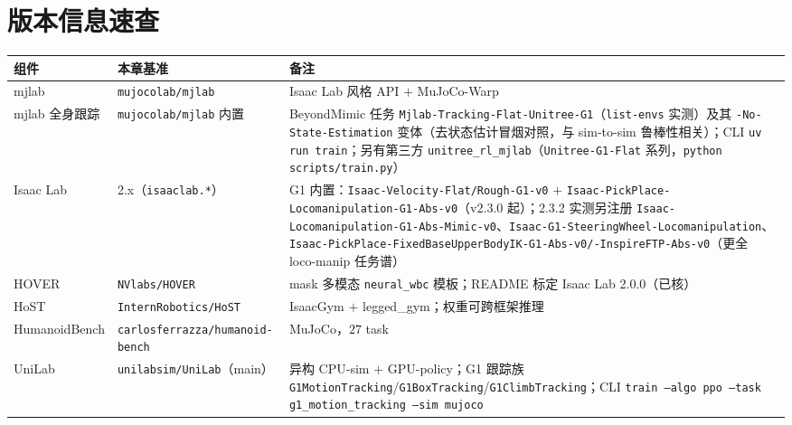 \section*{版本信息速查}

\begin{center}
\small
\begin{tabular}{p{3.4cm}p{4.2cm}p{5.0cm}}
\hline
组件 & 本章基准 & 备注 \\
\hline
mjlab & \texttt{mujocolab/\allowbreak mjlab} & Isaac Lab 风格 API $+$ MuJoCo-Warp\cite{mjlab2026} \\
mjlab 全身跟踪 & \texttt{mujocolab/\allowbreak mjlab} 内置 & BeyondMimic 任务 \texttt{Mjlab-Tracking-Flat-Unitree-G1}（\texttt{list-envs} 实测）及其 \texttt{-No-State-Estimation} 变体（去状态估计冒烟对照，与 sim-to-sim 鲁棒性相关）；CLI \texttt{uv run train}；另有第三方 \texttt{unitree\_rl\_mjlab}（\texttt{Unitree-G1-Flat} 系列，\texttt{python scripts/\allowbreak train.\allowbreak py}） \\
Isaac Lab & 2.x（\texttt{isaaclab.*}） & G1 内置：\texttt{Isaac-Velocity-Flat/\allowbreak Rough-G1-v0} $+$ \texttt{Isaac-PickPlace-Locomanipulation-G1-Abs-v0}（v2.3.0 起）；2.3.2 实测另注册 \texttt{Isaac-Locomanipulation-G1-Abs-Mimic-v0}、\texttt{Isaac-G1-SteeringWheel-Locomanipulation}、\texttt{Isaac-PickPlace-FixedBaseUpperBodyIK-G1-Abs-v0/\allowbreak -InspireFTP-Abs-v0}（更全 loco-manip 任务谱） \\
HOVER & \texttt{NVlabs/\allowbreak HOVER} & mask 多模态 \texttt{neural\_wbc} 模板；README 标定 Isaac Lab 2.0.0（已核）\cite{he2025hover} \\
HoST & \texttt{InternRobotics/\allowbreak HoST} & IsaacGym $+$ legged\_gym；权重可跨框架推理\cite{huang2025host} \\
HumanoidBench & \texttt{carlosferrazza/\allowbreak humanoid-bench} & MuJoCo，$27$ task\cite{sferrazza2024humanoidbench} \\
UniLab & \texttt{unilabsim/\allowbreak UniLab}（main） & 异构 CPU-sim $+$ GPU-policy；G1 跟踪族 \texttt{G1MotionTracking}/\allowbreak\texttt{G1BoxTracking}/\allowbreak\texttt{G1ClimbTracking}；CLI \texttt{train --algo ppo --task g1\_motion\_tracking --sim mujoco}\cite{unilab2026} \\
\hline
\end{tabular}
\end{center}

